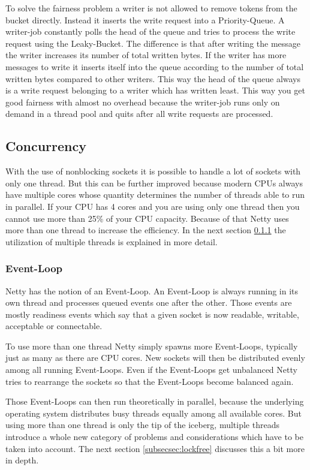 To solve the fairness problem a writer is not allowed to remove tokens from the bucket directly. Instead it inserts the write request into a Priority-Queue. A writer-job constantly polls the head of the queue and tries to process the write request using the Leaky-Bucket. The difference is that after writing the message the writer increases its number of total written bytes. If the writer has more messages to write it inserts itself into the queue according to the number of total written bytes compared to other writers. This way the head of the queue always is a write request belonging to a writer which has written least. This way you get good fairness with almost no overhead because the writer-job runs only on demand in a thread pool and quits after all write requests are processed.

\cleardoublepage
\subsection{Concurrency}
With the use of nonblocking sockets it is possible to handle a lot of sockets with only one thread. But this can be further improved because modern CPUs always have multiple cores whose quantity determines the number of threads able to run in parallel. If your CPU has 4 cores and you are using only one thread then you cannot use more than 25\% of your CPU capacity. Because of that Netty uses more than one thread to increase the efficiency. In the next section \ref{subsecsec:eventloop} the utilization of multiple threads is explained in more detail.

\subsubsection{Event-Loop}
\label{subsecsec:eventloop}
Netty has the notion of an Event-Loop. An Event-Loop is always running in its own thread and processes queued events one after the other. Those events are mostly readiness events which say that a given socket is now readable, writable, acceptable or connectable.

To use more than one thread Netty simply spawns more Event-Loops, typically just as many as there are CPU cores. New sockets will then be distributed evenly among all running Event-Loops. Even if the Event-Loops get unbalanced Netty tries to rearrange the sockets so that the Event-Loops become balanced again.

Those Event-Loops can then run theoretically in parallel, because the underlying operating system distributes busy threads equally among all available cores. But using more than one thread is only the tip of the iceberg, multiple threads introduce a whole new category of problems and considerations which have to be taken into account. The next section \ref{subsecsec:lockfree} discusses this a bit more in depth.


